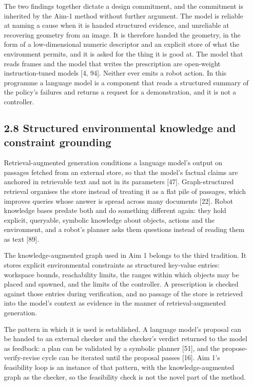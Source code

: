 \documentclass[
  11pt,
]{article}
\begin{document}
The two findings together dictate a design commitment, and the
commitment is inherited by the Aim-1 method without further argument.
The model is reliable at naming a cause when it is handed structured
evidence, and unreliable at recovering geometry from an image. It is
therefore handed the geometry, in the form of a low-dimensional numeric
descriptor and an explicit store of what the environment permits, and it
is asked for the thing it is good at. The model that reads frames and
the model that writes the prescription are open-weight instruction-tuned
models {[}4, 94{]}. Neither ever emits a robot action. In this programme
a language model is a component that reads a structured summary of the
policy's failures and returns a request for a demonstration, and it is
not a controller.

\hypertarget{structured-environmental-knowledge-and-constraint-grounding}{%
\subsection{2.8 Structured environmental knowledge and constraint
grounding}\label{structured-environmental-knowledge-and-constraint-grounding}}

Retrieval-augmented generation conditions a language model's output on
passages fetched from an external store, so that the model's factual
claims are anchored in retrievable text and not in its parameters
{[}47{]}. Graph-structured retrieval organises the store instead of
treating it as a flat pile of passages, which improves queries whose
answer is spread across many documents {[}22{]}. Robot knowledge bases
predate both and do something different again: they hold explicit,
queryable, symbolic knowledge about objects, actions and the
environment, and a robot's planner asks them questions instead of
reading them as text {[}89{]}.

The knowledge-augmented graph used in Aim 1 belongs to the third
tradition. It stores explicit environmental constraints as structured
key-value entries: workspace bounds, reachability limits, the ranges
within which objects may be placed and spawned, and the limits of the
controller. A prescription is checked against those entries during
verification, and no passage of the store is retrieved into the model's
context as evidence in the manner of retrieval-augmented generation.

The pattern in which it is used is established. A language model's
proposal can be handed to an external checker and the checker's verdict
returned to the model as feedback: a plan can be validated by a symbolic
planner {[}51{]}, and the propose-verify-revise cycle can be iterated
until the proposal passes {[}16{]}. Aim 1's feasibility loop is an
instance of that pattern, with the knowledge-augmented graph as the
checker, so the feasibility check is not the novel part of the method.
\end{document}
